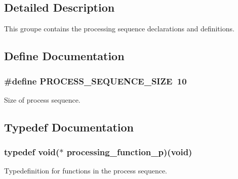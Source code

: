 \subsection{\-Detailed \-Description}
\-This groupe contains the processing sequence declarations and definitions. 

\subsection{\-Define \-Documentation}
\hypertarget{group__proc__sequence_gaeda836195bc58fa7dc02a15d8b6e37ff}{
\subsubsection[{\-P\-R\-O\-C\-E\-S\-S\-\_\-\-S\-E\-Q\-U\-E\-N\-C\-E\-\_\-\-S\-I\-Z\-E}]{\setlength{\rightskip}{0pt plus 5cm}\#define \-P\-R\-O\-C\-E\-S\-S\-\_\-\-S\-E\-Q\-U\-E\-N\-C\-E\-\_\-\-S\-I\-Z\-E~10}}
\label{group__proc__sequence_gaeda836195bc58fa7dc02a15d8b6e37ff}


\-Size of process sequence. 



\subsection{\-Typedef \-Documentation}
\hypertarget{group__proc__sequence_ga5fcb98b03e729c4ec685656d28ba37e2}{
\subsubsection[{processing\-\_\-function\-\_\-p}]{\setlength{\rightskip}{0pt plus 5cm}typedef void($\ast$ {\bf processing\-\_\-function\-\_\-p})(void)}}
\label{group__proc__sequence_ga5fcb98b03e729c4ec685656d28ba37e2}


\-Typedefinition for functions in the process sequence. 



